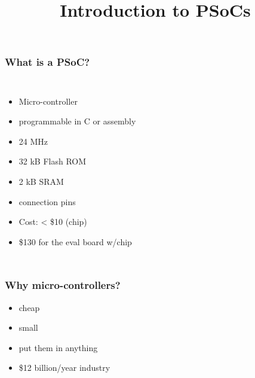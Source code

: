 \documentclass[t,english]{beamer}
\begin{document}
\title{Introduction to PSoCs%
  \label{introduction-to-psocs}}
\author{}
\date{}
\maketitle

\begin{frame}
\frametitle{What is a PSoC?}

\begin{columns}[T]
\begin{itemize}[<+-| alert@+>]

\item Micro-controller

\item programmable in C or assembly

\item 24 MHz

\item 32 kB Flash ROM

\item 2 kB SRAM

\item connection pins

\item Cost: < \$10 (chip)

\item \$130 for the eval board w/chip
\end{itemize}


\noindent{}

\end{columns}
\end{frame}

\begin{frame}
\frametitle{Why micro-controllers?}

\begin{itemize}[<+-| alert@+>]

\item cheap

\item small

\item put them in anything

\item \$12 billion/year industry
\end{itemize}
\end{frame}
\end{document}
